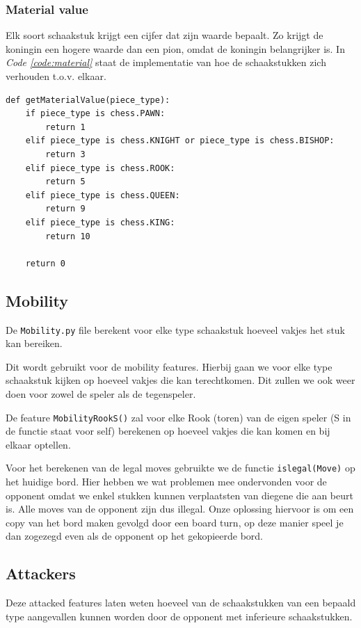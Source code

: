 \documentclass[a4paper,openany]{uantwerpenassignment}
\newcommand{\codeword}[1]{
    \colorbox{code}{\texttt{\textcolor{codetext}{#1}}}
}
\newcommand{\coderef}[1]{\textit{Code \ref{#1}}}
\begin{document}
\subsubsection{Material value}
Elk soort schaakstuk krijgt een cijfer dat zijn waarde bepaalt. Zo krijgt de koningin een hogere waarde dan een pion, omdat de koningin belangrijker is. In \coderef{code:material} staat de implementatie van hoe de schaakstukken zich verhouden t.o.v. elkaar.

\begin{lstlisting}[style=mypython,caption={Material Function},captionpos=b,label={code:material}]
def getMaterialValue(piece_type):
    if piece_type is chess.PAWN:
        return 1
    elif piece_type is chess.KNIGHT or piece_type is chess.BISHOP:
        return 3
    elif piece_type is chess.ROOK:
        return 5
    elif piece_type is chess.QUEEN:
        return 9
    elif piece_type is chess.KING:
        return 10

    return 0
\end{lstlisting}

\subsection{Mobility}
De \codeword{Mobility.py} file berekent voor elke type schaakstuk hoeveel vakjes het stuk kan bereiken. 

Dit wordt gebruikt voor de mobility features. Hierbij gaan we voor elke type schaakstuk kijken op hoeveel vakjes die kan terechtkomen. Dit zullen we ook weer doen voor zowel de speler als de tegenspeler.

De feature \codeword{MobilityRookS()} zal voor elke Rook (toren) van de eigen speler (S in de functie staat voor self) berekenen op hoeveel vakjes die kan komen en bij elkaar optellen.

Voor het berekenen van de legal moves gebruikte we de functie \codeword{islegal(Move)} op het huidige bord.  Hier hebben we wat problemen mee ondervonden voor de opponent omdat we enkel stukken kunnen verplaatsten van diegene die aan beurt is. Alle moves van de opponent zijn dus illegal. Onze oplossing hiervoor is om een copy van het bord maken gevolgd door een board turn, op deze manier speel je dan zogezegd even als de opponent op het gekopieerde bord. 
\pagebreak

\pagebreak

\subsection{Attackers}
Deze attacked features laten weten hoeveel van de schaakstukken van een bepaald type aangevallen kunnen worden door de opponent met inferieure schaakstukken. 
\end{document}
